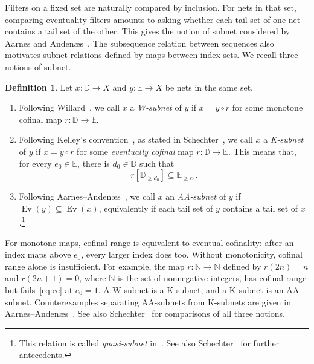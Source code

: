 \documentclass[11pt,a4paper]{article}
\theoremstyle{definition}
\newtheorem{definition}[theorem]{Definition}
\theoremstyle{remark}
\newcommand{\NN}{\mathbb N}
\newcommand{\Ev}{\operatorname{Ev}}
\begin{document}
Filters on a fixed set are naturally compared by inclusion. For nets
in that set, comparing eventuality filters amounts to asking whether
each tail set of one net contains a tail set of the other. This gives
the notion of subnet considered by Aarnes and Anden\ae s~\cite[Definition 2.1 and Lemma 2.2]{AA}.
The subsequence relation between sequences also motivates subnet
relations defined by maps between index sets. We recall three notions
of subnet.

\begin{definition}\label{def:subnets}
Let \(x:\mathbb{D}\to X\) and \(y:\mathbb{E}\to X\) be nets in
the same set.
\begin{enumerate}[label=(\roman*)]
\item Following Willard~\cite[Definition 11.2]{Willard}, we call
\(x\) a \emph{W-subnet} of \(y\) if \(x=y\circ r\) for some
monotone cofinal map \(r:\mathbb{D}\to\mathbb{E}\).
\item Following Kelley's convention~\cite{Kelley}, as stated in
Schechter~\cite[Section 7.15(b)]{Schechter}, we call \(x\) a
\emph{K-subnet} of \(y\) if \(x=y\circ r\) for some
\emph{eventually cofinal} map \(r:\mathbb{D}\to\mathbb{E}\).
This means that, for every \(e_0\in\mathbb{E}\), there is
\(d_0\in\mathbb{D}\) such that
\begin{equation}\label{eq:ec}
 r[\mathbb{D}_{\ge d_0}]\subseteq\mathbb{E}_{\ge e_0}.
\end{equation}

\item Following Aarnes--Anden\ae s~\cite[Definition 2.1 and
Lemma 2.2]{AA}, we call \(x\) an \emph{AA-subnet} of \(y\) if
\(\Ev(y)\subseteq\Ev(x)\), equivalently if each tail set of \(y\)
contains a tail set of \(x\).\footnote{This relation is called
\emph{quasi-subnet} in~\cite[Section 2]{OTW}. See also
Schechter~\cite[Section 7.14]{Schechter} for further antecedents.}
\end{enumerate}
\end{definition}

For monotone maps, cofinal range is equivalent to eventual cofinality:
after an index maps above \(e_0\), every larger index does too.
Without monotonicity, cofinal range alone is insufficient. For example,
the map \(r:\NN\to\NN\) defined by \(r(2n)=n\) and \(r(2n+1)=0\),
where \(\NN\) is the set of nonnegative integers, has cofinal range
but fails~\eqref{eq:ec} at \(e_0=1\). A W-subnet is a K-subnet, and a K-subnet
is an AA-subnet. Counterexamples separating AA-subnets from
K-subnets are given in Aarnes--Anden\ae s~\cite[Examples 2.4--2.5]{AA}.
See also Schechter~\cite[Section 7.16]{Schechter} for comparisons
of all three notions.
\end{document}
